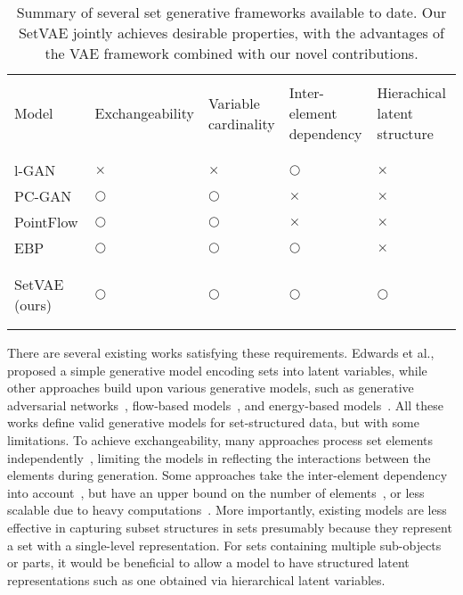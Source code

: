\documentclass[final]{arxiv/cvpr}
\begin{document}
\begin{table*}[!ht]
\centering
\footnotesize
\caption{Summary of several set generative frameworks available to date. Our SetVAE jointly achieves desirable properties, with the advantages of the VAE framework combined with our novel contributions.
}
\begin{tabular}{l>{\centering}m{}>{\centering}m{}>{\centering}m{}>{\centering\arraybackslash}m{}}
\Xhline{2\arrayrulewidth}
\\[-1em] Model & Exchangeability & \shortstack{Variable\\cardinality} & \shortstack{Inter-element\\dependency} & \shortstack{Hierachical\\latent structure} \\
\\[-1em]\Xhline{2\arrayrulewidth}
\\[-1em]
l-GAN \cite{achlioptas2018learning} & $\times$ & $\times$ & $\bigcirc$ & $\times$ \\
PC-GAN \cite{li2018point} & $\bigcirc$ & $\bigcirc$ & $\times$ & $\times$ \\
PointFlow \cite{yang2019pointflow} & $\bigcirc$ & $\bigcirc$ & $\times$ & $\times$ \\
EBP \cite{yang2020energybased} & $\bigcirc$ & $\bigcirc$ & $\bigcirc$ & $\times$ \\
\\[-1em]\hline
\\[-1em] SetVAE (ours) & $\bigcirc$ & $\bigcirc$ & $\bigcirc$ & $\bigcirc$ \\
\\[-1em]\Xhline{2\arrayrulewidth}
\end{tabular}
\label{table:framework}
\end{table*}

There are several existing works satisfying these requirements.
Edwards et al.,~\cite{edwards2017neural} proposed a simple generative model encoding sets into latent variables, while other approaches build upon various generative models, such as generative adversarial networks~\cite{li2018point, stelzner2020generative}, flow-based models~\cite{yang2019pointflow,kim2020softflow}, and energy-based models~\cite{yang2020energybased}.
All these works define valid generative models for set-structured data, but with some limitations.
To achieve exchangeability, many approaches process set elements independently~\cite{li2018point, yang2019pointflow}, limiting the models in reflecting the interactions between the elements during generation.
Some approaches take the inter-element dependency into account~\cite{stelzner2020generative, yang2020energybased}, but have an upper bound on the number of elements~\cite{stelzner2020generative}, or less scalable due to heavy computations~\cite{yang2020energybased}.
More importantly, existing models are less effective in capturing subset structures in sets presumably because they represent a set with a single-level representation.
For sets containing multiple sub-objects or parts, it would be beneficial to allow a model to have structured latent representations such as one obtained via hierarchical latent variables.
\end{document}
